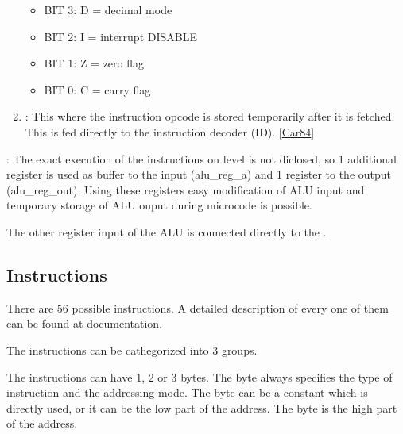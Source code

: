\documentclass[letterpaper,10pt,english]{sphinxmanual}
\begin{document}
\begin{enumerate}
\begin{itemize}
\item {} 
\sphinxAtStartPar
BIT 3: D = decimal mode 

\item {} 
\sphinxAtStartPar
BIT 2: I = interrupt DISABLE 

\item {} 
\sphinxAtStartPar
BIT 1: Z = zero flag

\item {} 
\sphinxAtStartPar
BIT 0: C = carry flag

\end{itemize}

\item {} 
\sphinxAtStartPar
{}: This where the instruction op\sphinxhyphen{}code is stored
temporarily after it is fetched. This is fed directly to the instruction decoder
(ID). {[}\hyperlink{cite.index:id11}{Car84}{]}

\end{enumerate}

\sphinxAtStartPar
{}: The exact execution of the instructions on
{\hyperref[\detokenize{core_6502:microcode}]{}} level is not diclosed, so 1 additional register is used as
buffer to the {\hyperref[\detokenize{alu_6502::doc}]{}} input (alu\_reg\_a) and 1 register to the
output (alu\_reg\_out). Using these registers easy modification of ALU input and
temporary storage of ALU ouput during microcode is possible.

\sphinxAtStartPar
The other register input of the ALU is connected directly to the {\hyperref[\detokenize{core_6502:pinout}]{}}.


\subsection{Instructions}
\label{\detokenize{core_6502:instructions}}
\sphinxAtStartPar
There are 56 possible instructions. A detailed description of every one of them
can be found at {\hyperref[\detokenize{id_6502::doc}]{}} documentation.

\sphinxAtStartPar
The instructions can be cathegorized into 3 groups.

\sphinxAtStartPar
The instructions can have 1, 2 or 3 bytes. The  byte always specifies the
type of instruction and the addressing mode. The  byte can be a constant
which is directly used, or it can be the low part of the address. The 
byte is the high part of the address.
\end{document}
